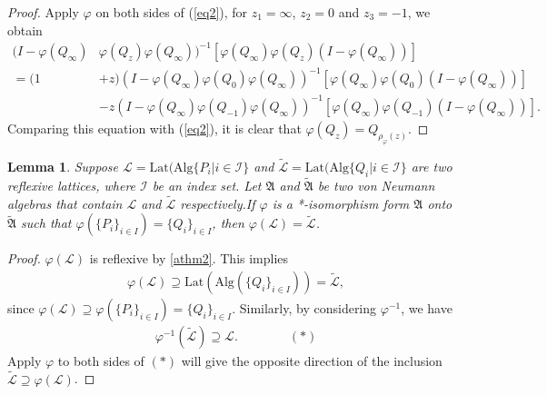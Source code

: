 \documentclass{amsart}
\newcommand{\AAA}{\mathfrak A}
\newcommand{\LLL}{\mathcal L} %
\newcommand{\Lat}{\mathrm{Lat}}
\newcommand{\Alg}{\mathrm{Alg}}
\newtheorem{lemma}{Lemma}[section]
\begin{document}
\begin{proof}
Apply $\varphi$ on both sides of (\ref{eq2}), for $z_1 = \infty$, $z_2 = 0$ and $z_3 = -1$, we obtain 
\begin{align*}
(I - \varphi(Q_{\infty})& \varphi(Q_{z}) \varphi(Q_{\infty}))^{-1}[\varphi(Q_{\infty}) \varphi(Q_{z})  (I-\varphi(Q_{\infty}))]\\
=(1 &+z)(I - \varphi(Q_{\infty}) \varphi(Q_{0}) \varphi(Q_{\infty}))^{-1}[ \varphi(Q_{\infty}) \varphi(Q_{0}) (I-\varphi(Q_{\infty}))] \\
 & - z(I - \varphi(Q_{\infty}) \varphi(Q_{-1}) \varphi(Q_{\infty}))^{-1}[ \varphi(Q_{\infty}) \varphi(Q_{-1})(I- \varphi(Q_{\infty}))].
\end{align*}
Comparing this equation with (\ref{eq2}), it is clear that  $\varphi(Q_{z}) = Q_{\rho_{\varphi} (z)}$.
\end{proof}


\begin{lemma}\label{2lemma3}
Suppose $\LLL = \Lat(\Alg \{ P_{i} | i \in \mathcal{I} \}$ and $\widetilde{\LLL} = \Lat(\Alg \{Q_{i} | i \in \mathcal{I} \}$ are two reflexive lattices, where $\mathcal{I}$ be an index set. 
Let $\AAA$ and $\widetilde{\AAA} $ be two von Neumann algebras that contain 
$\LLL$ and $\widetilde{\LLL}$ respectively.If 
$\varphi$ is a *-isomorphism form $\AAA$ onto $\widetilde{\AAA}$ such that 
$\varphi(\{ P_{i} \}_{i \in I})= \{ Q_{i} \}_{i \in I}$, then  $\varphi(\LLL) = \widetilde{\LLL}$.
\end{lemma}

\begin{proof}
$\varphi(\LLL)$ is reflexive by \ref{athm2}. This implies 
\begin{align*}
\varphi(\LLL) \supseteq \Lat(\Alg(\{ Q_{i} \}_{i \in I})) = \widetilde{\LLL},
\end{align*}
since $\varphi(\LLL) \supseteq \varphi(\{ P_{i} \}_{i \in I}) = \{ Q_{i} \}_{i \in I}$.
Similarly, by considering $\varphi^{-1}$, we have
\begin{align*}
\varphi^{-1}(\widetilde{\LLL}) \supseteq \LLL. \qquad \qquad (*)
\end{align*}
Apply $\varphi$ to both sides of $(*)$ will give the opposite direction of the inclusion
$\widetilde{\LLL} \supseteq \varphi(\LLL)$.
\end{proof}
\end{document}
